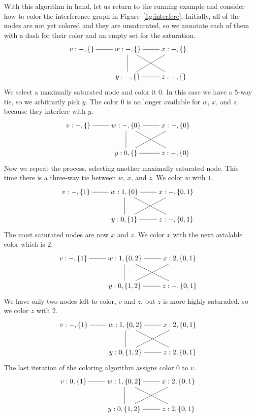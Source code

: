 \documentclass[12pt]{book}
\begin{document}
With this algorithm in hand, let us return to the running example and
consider how to color the interference graph in
Figure~\ref{fig:interfere}. Initially, all of the nodes are not yet
colored and they are unsaturated, so we annotate each of them with a
dash for their color and an empty set for the saturation.
\[
\xymatrix{
  v:-,\{\} \ar@{-}[r] & w:-,\{\} \ar@{-}[r]\ar@{-}[d]\ar@{-}[dr] &  x:-,\{\} \ar@{-}[dl]\\
               & y:-,\{\} \ar@{-}[r] & z:-,\{\}
}
\]
We select a maximally saturated node and color it $0$. In this case we
have a 5-way tie, so we arbitrarily pick $y$. The color $0$ is no
longer available for $w$, $x$, and $z$ because they interfere with
$y$.
\[
\xymatrix{
  v:-,\{\} \ar@{-}[r] & w:-,\{0\} \ar@{-}[r]\ar@{-}[d]\ar@{-}[dr] &  x:-,\{0\} \ar@{-}[dl]\\
               & y:0,\{\} \ar@{-}[r] & z:-,\{0\}
}
\]
Now we repeat the process, selecting another maximally saturated node.
This time there is a three-way tie between $w$, $x$, and $z$. We color
$w$ with $1$.
\[
\xymatrix{
  v:-,\{1\} \ar@{-}[r] & w:1,\{0\} \ar@{-}[r]\ar@{-}[d]\ar@{-}[dr] &  x:-,\{0,1\} \ar@{-}[dl]\\
               & y:0,\{1\} \ar@{-}[r] & z:-,\{0,1\}
}
\]
The most saturated nodes are now $x$ and $z$. We color $x$ with the
next avialable color which is $2$.
\[
\xymatrix{
  v:-,\{1\} \ar@{-}[r] & w:1,\{0,2\} \ar@{-}[r]\ar@{-}[d]\ar@{-}[dr] &  x:2,\{0,1\} \ar@{-}[dl]\\
               & y:0,\{1,2\} \ar@{-}[r] & z:-,\{0,1\}
}
\]
We have only two nodes left to color, $v$ and $z$, but $z$ is
more highly saturaded, so we color $z$ with $2$.
\[
\xymatrix{
  v:-,\{1\} \ar@{-}[r] & w:1,\{0,2\} \ar@{-}[r]\ar@{-}[d]\ar@{-}[dr] &  x:2,\{0,1\} \ar@{-}[dl]\\
               & y:0,\{1,2\} \ar@{-}[r] & z:2,\{0,1\}
}
\]
The last iteration of the coloring algorithm assigns color $0$ to $v$.
\[
\xymatrix{
  v:0,\{1\} \ar@{-}[r] & w:1,\{0,2\} \ar@{-}[r]\ar@{-}[d]\ar@{-}[dr] &  x:2,\{0,1\} \ar@{-}[dl]\\
               & y:0,\{1,2\} \ar@{-}[r] & z:2,\{0,1\}
}
\]
\end{document}

